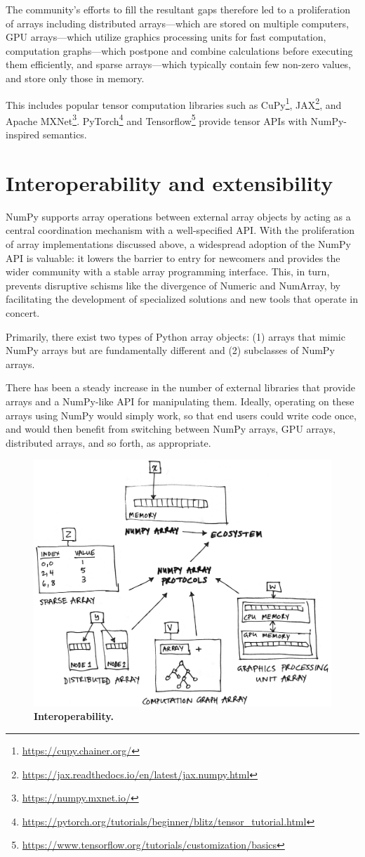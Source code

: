 The community's efforts to fill the resultant gaps therefore led to a
proliferation of arrays including distributed arrays---which are stored on
multiple computers, GPU arrays---which utilize graphics processing units for
fast computation, computation graphs---which postpone and combine calculations
before executing them efficiently, and sparse arrays---which typically contain
few non-zero values, and store only those in memory.

This includes popular tensor computation libraries such as
CuPy\footnote{\url{https://cupy.chainer.org/}},
JAX\footnote{\url{https://jax.readthedocs.io/en/latest/jax.numpy.html}}, and
Apache MXNet\footnote{\url{https://numpy.mxnet.io/}}.
PyTorch\footnote{\url{https://pytorch.org/tutorials/beginner/blitz/tensor\_tutorial.html}}
and
Tensorflow\footnote{\url{https://www.tensorflow.org/tutorials/customization/basics}}
provide tensor APIs with NumPy-inspired semantics.

\section*{Interoperability and extensibility}

NumPy supports array operations between external array objects by
acting as a central coordination mechanism with a well-specified API.
With the proliferation of array implementations discussed above, a
widespread adoption of the NumPy API is valuable: it lowers the
barrier to entry for newcomers and provides the wider community with a
stable array programming interface. This, in turn, prevents disruptive
schisms like the divergence of Numeric and NumArray, by facilitating
the development of specialized solutions and new tools that operate in
concert.

Primarily, there
exist two types of Python array objects: (1) arrays that mimic NumPy arrays but are
fundamentally different and (2) subclasses of NumPy arrays.

There has been a steady increase in the number of external libraries that
provide arrays and a NumPy-like API for manipulating them.
Ideally, operating on these arrays using NumPy would simply work, so that end
users could write code once, and would then benefit from switching between
NumPy arrays, GPU arrays, distributed arrays, and so forth, as appropriate.

\begin{figure}
  \centering
  \includegraphics[width=.45\textwidth]{static/sketches/duck-arrays}
  \caption{\textbf{Interoperability.} }\label{fig:duck-arrays}
\end{figure}


